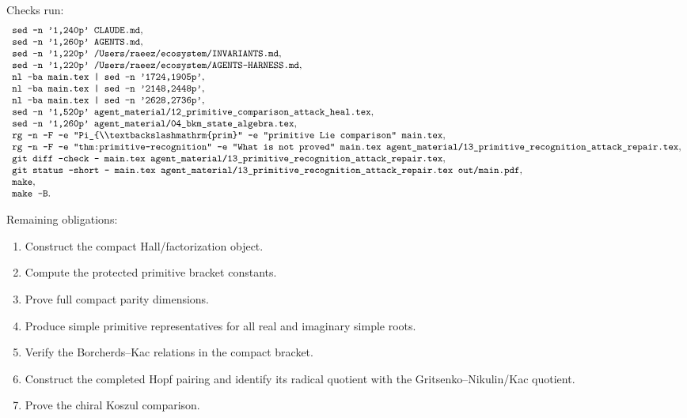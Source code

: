Checks run:
\[
\begin{array}{l}
\texttt{sed -n '1,240p' CLAUDE.md},\\
\texttt{sed -n '1,260p' AGENTS.md},\\
\texttt{sed -n '1,220p' /Users/raeez/ecosystem/INVARIANTS.md},\\
\texttt{sed -n '1,220p' /Users/raeez/ecosystem/AGENTS-HARNESS.md},\\
\texttt{nl -ba main.tex | sed -n '1724,1905p'},\\
\texttt{nl -ba main.tex | sed -n '2148,2448p'},\\
\texttt{nl -ba main.tex | sed -n '2628,2736p'},\\
\texttt{sed -n '1,520p' agent\_material/12\_primitive\_comparison\_attack\_heal.tex},\\
\texttt{sed -n '1,260p' agent\_material/04\_bkm\_state\_algebra.tex},\\
\texttt{rg -n -F -e "Pi\_\{\textbackslash\textbackslashmathrm\{prim\}" -e "primitive Lie comparison" main.tex},\\
\texttt{rg -n -F -e "thm:primitive-recognition" -e "What is not proved" main.tex agent\_material/13\_primitive\_recognition\_attack\_repair.tex},\\
\texttt{git diff --check -- main.tex agent\_material/13\_primitive\_recognition\_attack\_repair.tex},\\
\texttt{git status --short -- main.tex agent\_material/13\_primitive\_recognition\_attack\_repair.tex out/main.pdf},\\
\texttt{make},\\
\texttt{make -B}.
\end{array}
\]

Remaining obligations:
\begin{enumerate}
\item Construct the compact Hall/factorization object.
\item Compute the protected primitive bracket constants.
\item Prove full compact parity dimensions.
\item Produce simple primitive representatives for all real and imaginary
simple roots.
\item Verify the Borcherds--Kac relations in the compact bracket.
\item Construct the completed Hopf pairing and identify its radical
quotient with the Gritsenko--Nikulin/Kac quotient.
\item Prove the chiral Koszul comparison.
\end{enumerate}
